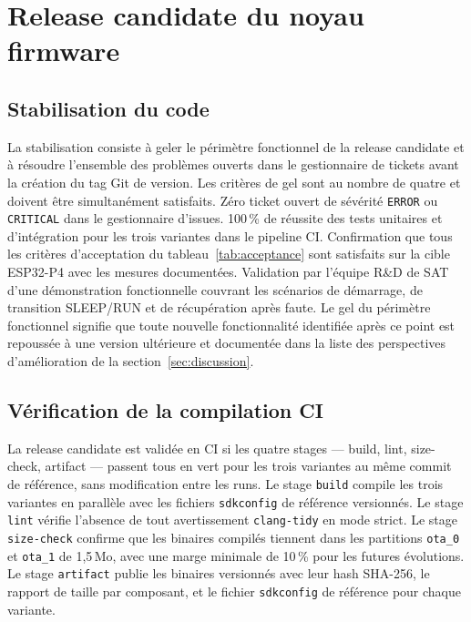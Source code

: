 \section{Release candidate du noyau firmware}
\label{sec:release}

\subsection{Stabilisation du code}
\label{subsec:stab}

La stabilisation consiste à geler le périmètre fonctionnel de la
release candidate et à résoudre l'ensemble des problèmes ouverts
dans le gestionnaire de tickets avant la création du tag Git de
version. Les critères de gel sont au nombre de quatre et doivent
être simultanément satisfaits. Zéro ticket ouvert de sévérité
\texttt{ERROR} ou \texttt{CRITICAL} dans le gestionnaire d'issues.
100\,\% de réussite des tests unitaires et d'intégration pour les
trois variantes dans le pipeline CI. Confirmation que tous les critères
d'acceptation du tableau~\ref{tab:acceptance} sont satisfaits sur la
cible ESP32-P4 avec les mesures documentées. Validation par l'équipe
R\&D de SAT d'une démonstration fonctionnelle couvrant les scénarios
de démarrage, de transition SLEEP/RUN et de récupération après faute.
Le gel du périmètre fonctionnel signifie que toute nouvelle
fonctionnalité identifiée après ce point est repoussée à une version
ultérieure et documentée dans la liste des perspectives d'amélioration
de la section~\ref{sec:discussion}.

\subsection{Vérification de la compilation CI}
\label{subsec:ci_verif}

La release candidate est validée en CI si les quatre stages — build,
lint, size-check, artifact — passent tous en vert pour les trois
variantes au même commit de référence, sans modification entre les
runs. Le stage \texttt{build} compile les trois variantes en parallèle
avec les fichiers \texttt{sdkconfig} de référence versionnés. Le stage
\texttt{lint} vérifie l'absence de tout avertissement \texttt{clang-tidy}
en mode strict. Le stage \texttt{size-check} confirme que les binaires
compilés tiennent dans les partitions \texttt{ota\_0} et \texttt{ota\_1}
de 1,5\,Mo, avec une marge minimale de 10\,\% pour les futures
évolutions. Le stage \texttt{artifact} publie les binaires versionnés
avec leur hash SHA-256, le rapport de taille par composant, et le
fichier \texttt{sdkconfig} de référence pour chaque variante.

